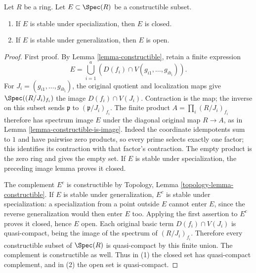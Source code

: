\begin{lemma}
\label{lemma-constructible-stable-specialization-closed}
Let $R$ be a ring. Let $E \subset \Spec(R)$ be a constructible subset.
\begin{enumerate}
\item If $E$ is stable under specialization, then $E$ is closed.
\item If $E$ is stable under generalization, then $E$ is open.
\end{enumerate}
\end{lemma}

\begin{proof}
First proof. By Lemma \ref{lemma-constructible}, retain
a finite expression
$$
E=\bigcup_{i=1}^a\left(D(f_i)\cap
V(g_{i1},\ldots,g_{ib_i})\right).
$$
For $J_i=(g_{i1},\ldots,g_{ib_i})$, the original
quotient and localization maps give
$\Spec((R/J_i)_{f_i})$ the image $D(f_i)\cap V(J_i)$.
Contraction is the map; the inverse on this subset
sends $\mathfrak p$ to $(\mathfrak p/J_i)_{f_i}$.
The finite product $A=\prod_i(R/J_i)_{f_i}$ therefore
has spectrum image $E$ under the diagonal original
map $R\to A$, as in Lemma \ref{lemma-constructible-is-image}.
Indeed the coordinate idempotents sum to $1$ and
have pairwise zero products, so every prime selects
exactly one factor; this identifies its contraction
with that factor's contraction. The empty product
is the zero ring and gives the empty set.
If $E$ is stable under specialization, the preceding
image lemma proves it closed.

The complement $E^c$ is constructible by
Topology, Lemma \ref{topology-lemma-constructible}.
If $E$ is stable under generalization, $E^c$ is
stable under specialization: a specialization from
a point outside $E$ cannot enter $E$, since the
reverse generalization would then enter $E$ too.
Applying the first assertion to $E^c$ proves it
closed, hence $E$ open.
Each original basic term $D(f_i)\cap V(J_i)$ is
quasi-compact, being the image of the spectrum of
$(R/J_i)_{f_i}$. Therefore every constructible subset
of $\Spec(R)$ is quasi-compact by this finite union.
The complement is constructible as well. Thus in (1)
the closed set has quasi-compact complement, and in
(2) the open set is quasi-compact.


\end{proof}
